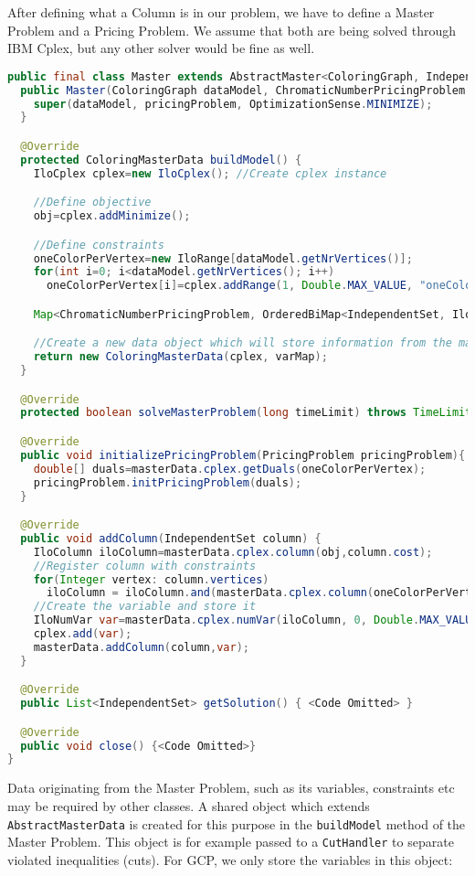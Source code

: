 \documentclass[a4paper]{article}
\newenvironment{myblock}[1]{%
    \tcolorbox[beamer,%
    noparskip,breakable,
    colback=lightBlueCodeBlock,colframe=darkBlueCodeBlock,%
    colbacklower=darkBlueCodeBlock!75!lightBlueCodeBlock,%
    coltitle=blueTitleCodeBlock,
    title=#1]}%
    {\endtcolorbox}
\newcommand{\code}[1]{\lstinline[language=java, style=seminar]!#1!}
\begin{document}
After defining what a Column is in our problem, we have to define a Master Problem and a Pricing Problem. We assume that both are being solved through IBM Cplex, but any other solver would be fine as well.
\begin{myblock}{Master}
\begin{lstlisting}[language=java, style=eclipseArticle, xleftmargin=2em]  
public final class Master extends AbstractMaster<ColoringGraph, IndependentSet, ChromaticNumberPricingProblem, ColoringMasterData> {
  public Master(ColoringGraph dataModel, ChromaticNumberPricingProblem pricingProblem) {
    super(dataModel, pricingProblem, OptimizationSense.MINIMIZE);
  }

  @Override
  protected ColoringMasterData buildModel() {
    IloCplex cplex=new IloCplex(); //Create cplex instance

    //Define objective
    obj=cplex.addMinimize();

    //Define constraints
    oneColorPerVertex=new IloRange[dataModel.getNrVertices()];
    for(int i=0; i<dataModel.getNrVertices(); i++)
      oneColorPerVertex[i]=cplex.addRange(1, Double.MAX_VALUE, "oneColorPerVertex");

    Map<ChromaticNumberPricingProblem, OrderedBiMap<IndependentSet, IloNumVar>> variableMap=...

    //Create a new data object which will store information from the master.
    return new ColoringMasterData(cplex, varMap);
  }

  @Override
  protected boolean solveMasterProblem(long timeLimit) throws TimeLimitExceededException { <Code Omitted> }

  @Override
  public void initializePricingProblem(PricingProblem pricingProblem){
    double[] duals=masterData.cplex.getDuals(oneColorPerVertex);
    pricingProblem.initPricingProblem(duals);
  }

  @Override
  public void addColumn(IndependentSet column) {
    IloColumn iloColumn=masterData.cplex.column(obj,column.cost);
    //Register column with constraints
    for(Integer vertex: column.vertices)
      iloColumn = iloColumn.and(masterData.cplex.column(oneColorPerVertex[vertex], 1));
    //Create the variable and store it
    IloNumVar var=masterData.cplex.numVar(iloColumn, 0, Double.MAX_VALUE, "x_"+masterData.getNrColumns());
    cplex.add(var);
    masterData.addColumn(column,var);
  }

  @Override
  public List<IndependentSet> getSolution() { <Code Omitted> }

  @Override
  public void close() {<Code Omitted>}	
}
\end{lstlisting}
\end{myblock}
Data originating from the Master Problem, such as its variables, constraints etc may be required by other classes. A shared object which extends \code{AbstractMasterData} is created for this purpose in the \code{buildModel} method of the Master Problem. This object is for example passed to a \code{CutHandler} to separate violated inequalities (cuts). For GCP, we only store the variables in this object:
\end{document}
